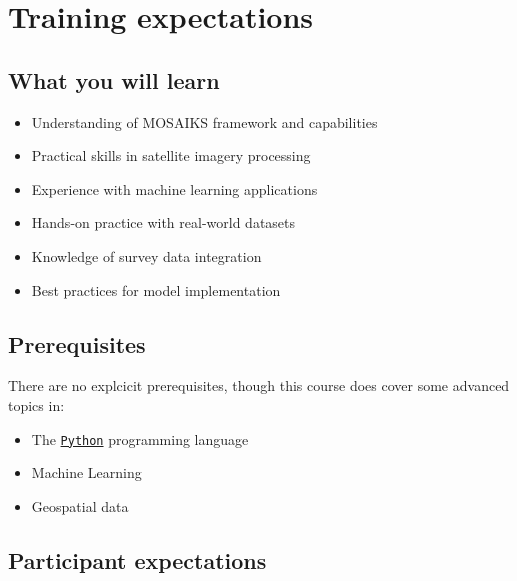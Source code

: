 \documentclass[
  letterpaper,
  DIV=11,
  numbers=noendperiod]{scrreprt}
\providecommand{\tightlist}{%
  \setlength{\itemsep}{0pt}\setlength{\parskip}{0pt}}\usepackage{longtable,booktabs,array}
\begin{document}
\hypertarget{training-expectations}{%
\section*{Training expectations}\label{training-expectations}}


\hypertarget{what-you-will-learn}{%
\subsection*{What you will learn}\label{what-you-will-learn}}

\begin{itemize}
\tightlist
\item
  Understanding of MOSAIKS framework and capabilities
\item
  Practical skills in satellite imagery processing
\item
  Experience with machine learning applications
\item
  Hands-on practice with real-world datasets
\item
  Knowledge of survey data integration
\item
  Best practices for model implementation
\end{itemize}

\hypertarget{prerequisites}{%
\subsection*{Prerequisites}\label{prerequisites}}

There are no explcicit prerequisites, though this course does cover some
advanced topics in:

\begin{itemize}
\tightlist
\item
  The \href{https://www.python.org/}{\texttt{Python}} programming
  language\\
\item
  Machine Learning\\
\item
  Geospatial data
\end{itemize}

\hypertarget{participant-expectations}{%
\subsection*{Participant expectations}\label{participant-expectations}}
\end{document}
